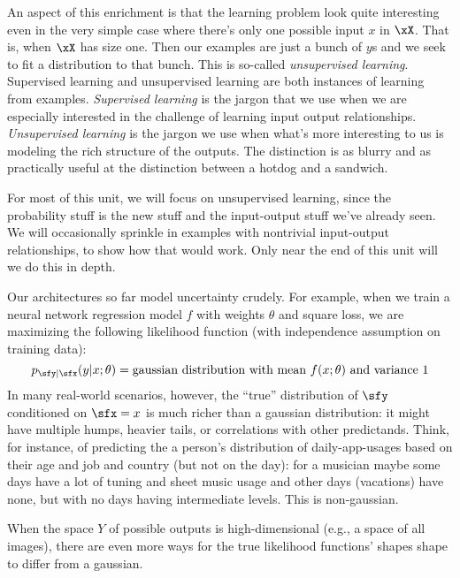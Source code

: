 An aspect of this enrichment is that the learning problem look quite
interesting even in the very simple case where there's only one possible input
$x$ in $\xX$.  That is, when $\xX$ has size one.  Then our examples are just a
bunch of $y$s and we seek to fit a distribution to that bunch.  This is
so-called \emph{unsupervised learning}.  Supervised learning and unsupervised
learning are both instances of learning from examples.  \emph{Supervised
learning} is the jargon that we use when we are especially interested in the
challenge of learning input output relationships.  \emph{Unsupervised learning}
is the jargon we use when what's more interesting to us is modeling the rich
structure of the outputs.  The distinction is as blurry and as practically
useful at the distinction between a hotdog and a sandwich.

For most of this unit, we will focus on unsupervised learning, since the
probability stuff is the new stuff and the input-output stuff we've already
seen.  We will occasionally sprinkle in examples with nontrivial input-output
relationships, to show how that would work.  Only near the end of this unit
will we do this in depth.

%
Our architectures so far model uncertainty crudely.
For example, when we train a neural network regression model $f$ with
weights $\theta$ and square loss, we are maximizing the following
likelihood function (with independence assumption on training data):
$$
  p_{\sfy|\sfx}(y|x;\theta) = \text{gaussian distribution with mean $f(x;\theta)$ and variance $1$}
$$
In many real-world scenarios, however, the ``true'' distribution of $\sfy$
conditioned on $\sfx=x$ is much richer than a gaussian distribution: it might
have multiple humps, heavier tails, or correlations with other predictands.
Think, for instance, of predicting the a person's distribution of
daily-app-usages based on their age and job and country (but not on the day):
for a musician maybe some days have a lot of tuning and sheet music usage and
other days (vacations) have none, but with no days having intermediate levels.
This is non-gaussian.

When the space $Y$ of possible outputs is high-dimensional (e.g., a space of
all images), there are even more ways for the true likelihood functions' shapes
shape to differ from a gaussian.

